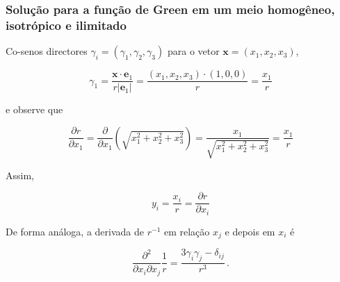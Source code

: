 \documentclass[xcolor=table]{beamer}
\newcommand{\xvec}{\mathbf{x}}
\newcommand{\evec}{\mathbf{e}}
\begin{document}
\begin{frame}
\frametitle{\textbf{Solu\c{c}\~ao para a fun\c{c}\~ao de Green em um meio homog\^eneo, isotr\'opico e ilimitado}}

\begin{flushleft}
Co-senos directores $\gamma_i= (\gamma_1,\gamma_2,\gamma_3)$ para o vetor $\xvec = (x_1,x_2,x_3)$, 
\end{flushleft}
\begin{equation}
 \gamma_1 = \frac{\xvec \cdot \evec_1}{r \left| \evec_1 \right|} = \frac{(x_1,x_2,x_3) \cdot (1,0,0)}{r} = \frac{x_1}{r}
\end{equation}
\begin{flushleft}
e observe que
\end{flushleft}
\begin{equation}
  \frac{\partial r}{\partial x_1} = \frac{\partial }{\partial x_1}\left( \sqrt{x_1^2 + x_2^2 + x_3^2} \right)   =  \frac{x_1}{\sqrt{x_1^2 + x_2^2 + x_3^2}} =  \frac{x_1}{r}
\end{equation}
\begin{flushleft}
Assim,
\end{flushleft}
\begin{equation}
  y_i = \frac{x_i}{r} = \frac{\partial r}{\partial x_i}  
\end{equation}
\begin{flushleft}
De forma an\'aloga, a derivada de $r^{-1}$ em rela\c{c}\~ao $x_j$ e depois em $x_i$ \'e
\end{flushleft}
\begin{equation}
 \frac{\partial^2}{\partial x_i \partial x_j} \frac{1}{r}  = \frac{3\gamma_i\gamma_j - \delta_{ij}}{r^3}\, .
\end{equation}

\end{frame}%
\end{document}

